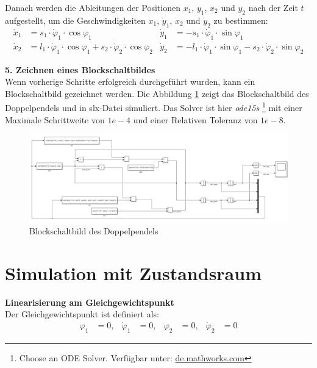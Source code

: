 Danach werden die Ableitungen der Positionen $x_1$, $y_1$, $x_2$ und $y_2$ nach der Zeit $t$ aufgestellt, um die Geschwindigkeiten $\dot{x}_1$, $\dot{y}_1$, $\dot{x}_2$ und $\dot{y}_2$ zu bestimmen:
\begin{align}
\dot{x}_1 &= s_1 \cdot \dot{\varphi}_1 \cdot \cos\varphi_1 & \dot{y}_1 &= -s_1 \cdot \dot{\varphi}_1 \cdot \sin\varphi_1 \\
\dot{x}_2 &= l_1 \cdot \dot{\varphi}_1 \cdot \cos\varphi_1 + s_2 \cdot \dot{\varphi}_2 \cdot \cos\varphi_2 & \dot{y}_2 &= -l_1 \cdot \dot{\varphi}_1 \cdot \sin\varphi_1 - s_2 \cdot \dot{\varphi}_2 \cdot \sin\varphi_2
\end{align}

\textbf{5. Zeichnen eines Blockschaltbildes}\\ 
Wenn vorherige Schritte erfolgreich durchgeführt wurden, kann ein Blockschaltbild gezeichnet werden. Die Abbildung \ref{fig:Blockschaltbild} zeigt das Blockschaltbild des Doppelpendels und in slx-Datei  simuliert. Das Solver ist hier \textit{ode15s} \footnote{Choose an ODE Solver. Verfügbar unter: \href{https://de.mathworks.com/help/matlab/math/choose-an-ode-solver.html}{de.mathworks.com}} mit einer Maximale Schrittweite von $1e-4$ und einer Relativen Toleranz von $1e-8$.
\begin{figure}[H]
  \centering
  \includegraphics[width=1\textwidth]{figures/Blockschaltbild.png}
  \caption{Blockschaltbild des Doppelpendels}
  \label{fig:Blockschaltbild}
\end{figure}

\section{Simulation mit Zustandsraum}
\textbf{Linearisierung am Gleichgewichtspunkt}\\
Der Gleichgewichtspunkt ist definiert als:
\begin{align}
  \varphi_1 &= 0, &\dot{\varphi}_1 &= 0, &\varphi_2 &= 0, &\dot{\varphi}_2 &= 0
\end{align}

